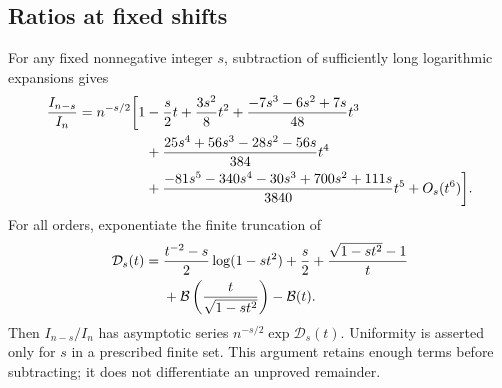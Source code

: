 \subsection{Ratios at fixed shifts}
For any fixed nonnegative integer $s$, subtraction of sufficiently long logarithmic expansions gives
\begin{align}
\frac{I_{n-s}}{I_n}=n^{-s/2}\bigg[1
 &-\frac s2t+\frac{3s^2}{8}t^2
 +\frac{-7s^3-6s^2+7s}{48}t^3\notag\\
 &+\frac{25s^4+56s^3-28s^2-56s}{384}t^4\notag\\
 &+\frac{-81s^5-340s^4-30s^3+700s^2+111s}{3840}t^5
 +O_s(t^6)\bigg].\label{tks:eq:shiftratio}
\end{align}
For all orders, exponentiate the finite truncation of
\begin{align}
\mathcal D_s(t)={}&\frac{t^{-2}-s}{2}\log(1-st^2)+\frac s2
 +\frac{\sqrt{1-st^2}-1}{t}\notag\\
 &+\mathcal B\left(\frac{t}{\sqrt{1-st^2}}\right)-\mathcal B(t).
 \label{tks:eq:shiftrule}
\end{align}
Then $I_{n-s}/I_n$ has asymptotic series $n^{-s/2}\exp\mathcal D_s(t)$. Uniformity is asserted only for $s$ in a prescribed finite set. This argument retains enough terms before subtracting; it does not differentiate an unproved remainder.
